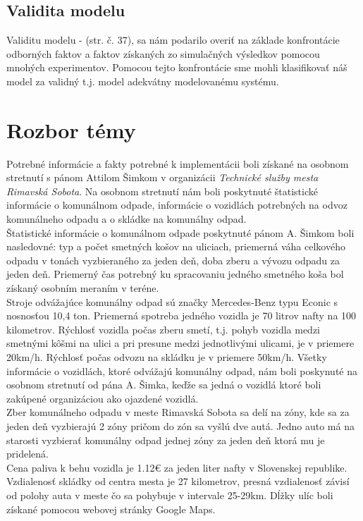 \documentclass[11pt,a4paper]{article}
\begin{document}
    \subsection{Validita modelu}

        \indent Validitu modelu - \cite{IMS}(str. č. 37), sa nám podarilo overiť na základe konfrontácie odborných faktov a faktov získaných zo simulačných výsledkov pomocou mnohých experimentov. Pomocou tejto konfrontácie sme mohli klasifikovať náš model za validný t.j. model adekvátny modelovanému systému.

\section{Rozbor témy}

    \indent Potrebné informácie a fakty potrebné k implementácii boli získané na osobnom stretnutí s pánom Attilom Šimkom v organizácii \textit{Technické služby mesta Rimavská Sobota}\cite{TSMRS}. Na osobnom stretnutí nám boli poskytnuté štatistické informácie o komunálnom odpade, informácie o vozidlách potrebných na odvoz komunálneho odpadu a o skládke na komunálny odpad.\\[0.4em]
    \indent Štatistické informácie o komunálnom odpade poskytnuté pánom A. Šimkom boli nasledovné: typ a počet smetných košov na uliciach, priemerná váha celkového odpadu v tonách vyzbieraného za jeden deň, doba zberu a vývozu odpadu za jeden deň. Priemerný čas potrebný ku spracovaniu jedného smetného koša bol získaný osobním meraním v teréne.\\[0.4em]
    \indent Stroje odvážajúce komunálny odpad sú značky Mercedes-Benz typu Econic s nosnosťou 10,4 ton. Priemerná spotreba jedného vozidla je 70 litrov nafty na 100 kilometrov. Rýchlosť vozidla počas zberu smetí, t.j. pohyb vozidla medzi smetnými kôšmi na ulici a pri presune medzi jednotlivými ulicami, je v priemere 20km/h. Rýchlosť počas odvozu na skládku je v priemere 50km/h. Všetky informácie o vozidlách, ktoré odvážajú komunálny odpad, nám boli poskynuté na osobnom stretnutí od pána A. Šimka, keďže sa jedná o vozidlá ktoré boli zakúpené organizáciou ako ojazdené vozidlá.\\[0.4em]
    \indent Zber komunálneho odpadu v meste Rimavská Sobota sa delí na zóny\cite{ZONA}, kde sa za jeden deň vyzbierajú 2 zóny pričom do zón sa vyšlú dve autá. Jedno auto má na starosti vyzbierať komunálny odpad jednej zóny za jeden deň ktorá mu je pridelená.\\[0.4em]
    \indent Cena paliva k behu vozidla je 1.12\euro{} za jeden liter nafty\cite{NAFTA} v Slovenskej republike. Vzdialenosť skládky od centra mesta je 27 kilometrov, presná vzdialenosť závisí od polohy auta v meste čo sa pohybuje v intervale 25-29km. Dĺžky ulíc boli získané pomocou webovej stránky Google Maps.
\end{document}
